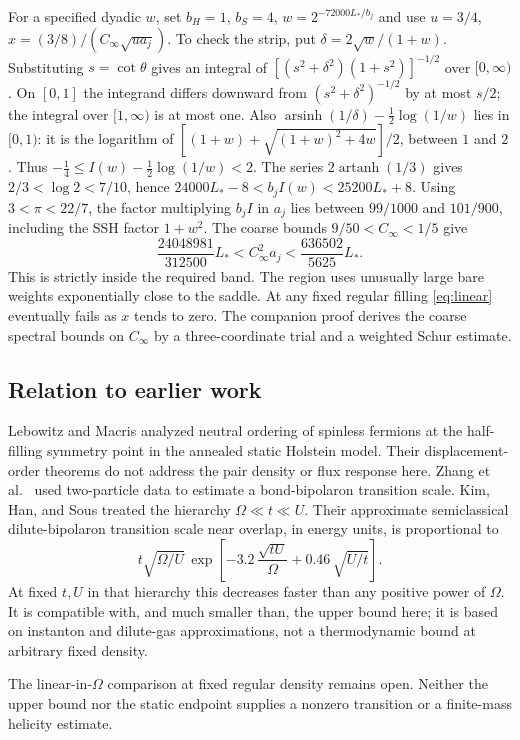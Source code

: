 \documentclass[11pt]{article}
\begin{document}
For a specified dyadic $w$, set $b_H=1$, $b_S=4$, $w=2^{-72000L_*/b_j}$ and use $u=3/4$, $x=(3/8)/(C_\infty\sqrt{u a_j})$. To check the strip, put $\delta=2\sqrt w/(1+w)$. Substituting $s=\cot\theta$ gives an integral of $[(s^2+\delta^2)(1+s^2)]^{-1/2}$ over $[0,\infty)$. On $[0,1]$ the integrand differs downward from $(s^2+\delta^2)^{-1/2}$ by at most $s/2$; the integral over $[1,\infty)$ is at most one. Also $\operatorname{arsinh}(1/\delta)-\frac12\log(1/w)$ lies in $[0,1)$: it is the logarithm of $[(1+w)+\sqrt{(1+w)^2+4w}]/2$, between $1$ and $2$. Thus $-\frac14\le I(w)-\frac12\log(1/w)<2$. The series $2\operatorname{artanh}(1/3)$ gives $2/3<\log 2<7/10$, hence $24000L_*-8<b_j I(w)<25200L_*+8$. Using $3<\pi<22/7$, the factor multiplying $b_j I$ in $a_j$ lies between $99/1000$ and $101/900$, including the SSH factor $1+w^2$. The coarse bounds $9/50<C_\infty<1/5$ give
\[
 \frac{24048981}{312500}L_*< C_\infty^2a_j<
 \frac{636502}{5625}L_* .
\]
This is strictly inside the required band. The region uses unusually large bare weights exponentially close to the saddle. At any fixed regular filling \eqref{eq:linear} eventually fails as $x$ tends to zero.
The companion proof derives the coarse spectral bounds on $C_\infty$ by a three-coordinate trial and a weighted Schur estimate.

\subsection*{Relation to earlier work}
Lebowitz and Macris \cite{lebo} analyzed neutral ordering of spinless fermions at the half-filling symmetry point in the annealed static Holstein model. Their displacement-order theorems do not address the pair density or flux response here. Zhang et al.\ \cite{zhang} used two-particle data to estimate a bond-bipolaron transition scale. Kim, Han, and Sous \cite[Eq.~(19)]{kim} treated the hierarchy $\Omega\ll t\ll U$. Their approximate semiclassical dilute-bipolaron transition scale near overlap, in energy units, is proportional to
\[
 t\sqrt{\Omega/U}\,
 \exp\!\left[-3.2\,\frac{\sqrt{tU}}{\Omega}
              +0.46\,\sqrt{U/t}\right].
\]
At fixed $t,U$ in that hierarchy this decreases faster than any positive power of $\Omega$. It is compatible with, and much smaller than, the upper bound here; it is based on instanton and dilute-gas approximations, not a thermodynamic bound at arbitrary fixed density.

The linear-in-$\Omega$ comparison at fixed regular density remains open. Neither the upper bound nor the static endpoint supplies a nonzero transition or a finite-mass helicity estimate.
\end{document}
